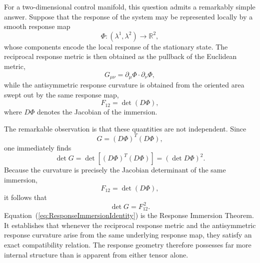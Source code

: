 For a two-dimensional control manifold, this question admits a
remarkably simple answer. Suppose that the response of the system
may be represented locally by a smooth response map
%
\begin{equation}
\Phi:
(\lambda^1,\lambda^2)
\longrightarrow
\mathbb{R}^2,
\end{equation}
%
whose components encode the local response of the stationary
state. The reciprocal response metric is then obtained as the
pullback of the Euclidean metric,
%
\begin{equation}
G_{\mu\nu}
=
\partial_\mu\Phi\cdot
\partial_\nu\Phi,
\end{equation}
%
while the antisymmetric response curvature is obtained from the
oriented area swept out by the same response map,
%
\begin{equation}
F_{12}
=
\det(D\Phi),
\end{equation}
%
where $D\Phi$ denotes the Jacobian of the immersion.

The remarkable observation is that these quantities are not
independent. Since
%
\begin{equation}
G=(D\Phi)^T(D\Phi),
\end{equation}
%
one immediately finds
%
\begin{equation}
\det G
=
\det\!\left[(D\Phi)^T(D\Phi)\right]
=
(\det D\Phi)^2.
\end{equation}
%
Because the curvature is precisely the Jacobian determinant of the
same immersion,
%
\begin{equation}
F_{12}
=
\det(D\Phi),
\end{equation}
%
it follows that
%
\begin{equation}
\boxed{
\det G
=
F_{12}^{\,2}.
}
\label{eq:ResponseImmersionIdentity}
\end{equation}
Equation~(\ref{eq:ResponseImmersionIdentity}) is the Response
Immersion Theorem. It establishes that whenever the reciprocal
response metric and the antisymmetric response curvature arise
from the same underlying response map, they satisfy an exact
compatibility relation. The response geometry therefore possesses
far more internal structure than is apparent from either tensor
alone.

